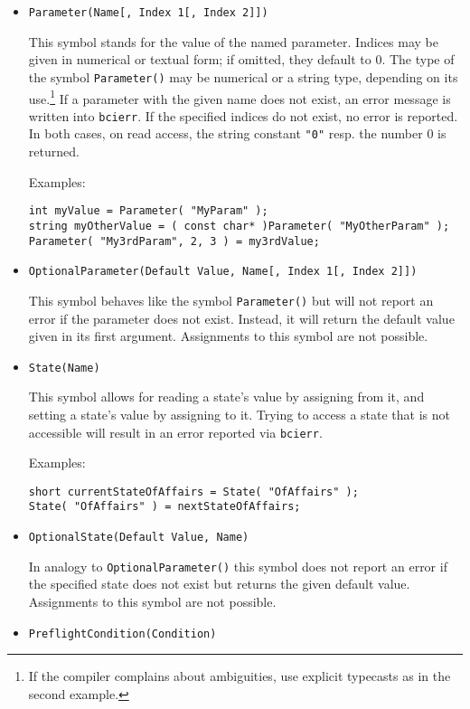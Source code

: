 \documentclass[12pt,a4paper]{article}
\begin{document}
\begin{itemize}
\item {\texttt{Parameter(Name[, Index 1[, Index 2]])}}

This symbol stands for the value of the named parameter. 
Indices may be given in numerical or textual form; if omitted,
they default to 0.
The type of the symbol \texttt{Parameter()} may be numerical or
a string type, depending on its use.\footnote{If the compiler
complains about ambiguities, use explicit typecasts as in the
second example.}
If a parameter with the given name does not
exist, an error message is written into \texttt{bcierr}.
If the specified indices do not exist,
no error is reported. In both cases, on read access, the
string constant \texttt{"0"} resp. the number 0 is returned.

Examples:
\begin{verbatim}
int myValue = Parameter( "MyParam" );
string myOtherValue = ( const char* )Parameter( "MyOtherParam" );
Parameter( "My3rdParam", 2, 3 ) = my3rdValue; 
\end{verbatim}

\item \texttt{OptionalParameter(Default Value, Name[, Index 1[, Index 2]])}

This symbol behaves like the symbol \texttt{Parameter()} but will not report
an error if the parameter does not exist. Instead, it will return the
default value given in its first argument. Assignments to this symbol are
not possible.

\item \texttt{State(Name)}

This symbol allows for reading a state's value by assigning from it, and
setting a state's value by assigning to it. Trying to access a state that
is not accessible will result in an error reported via \texttt{bcierr}.

Examples:
\begin{verbatim}
short currentStateOfAffairs = State( "OfAffairs" );
State( "OfAffairs" ) = nextStateOfAffairs;
\end{verbatim}

\item \texttt{OptionalState(Default Value, Name)}

In analogy to \texttt{OptionalParameter()} this symbol does not report
an error if the specified state does not exist but returns the given default
value. Assignments to this symbol are not possible.

\item \texttt{PreflightCondition(Condition)}


\end{itemize}
\end{document}
